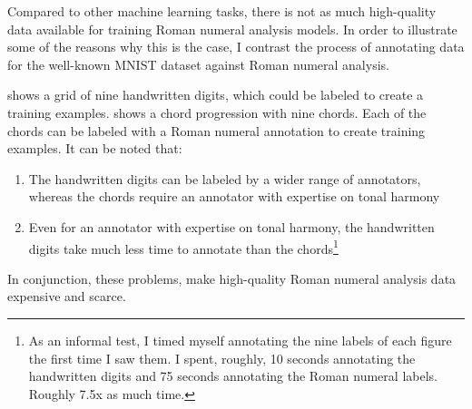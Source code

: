 

Compared to other machine learning tasks, there is not as
much high-quality data available for training Roman numeral
analysis models. In order to illustrate some of the reasons
why this is the case, I contrast the process of annotating
data for the well-known MNIST dataset
\cite{lecun1989handwritten} against Roman numeral analysis.


 shows a grid of nine handwritten digits,
which could be labeled to create a training examples.
 shows a chord progression with nine chords.
Each of the chords can be labeled with a Roman numeral
annotation to create training examples. It can be noted
that:

\begin{enumerate}
    \item The handwritten digits can be labeled by a wider
    range of annotators, whereas the chords require an annotator with expertise on tonal harmony
    \item Even for an annotator with expertise on tonal harmony, the handwritten digits take much less time to annotate than the chords\footnote{As an informal test, I timed myself annotating the nine labels of each figure the first time I saw them. I spent, roughly, 10 seconds annotating the handwritten digits and 75 seconds annotating the Roman numeral labels. Roughly 7.5x as much time.}
\end{enumerate}

In conjunction, these problems, make high-quality Roman numeral analysis data expensive and scarce.


